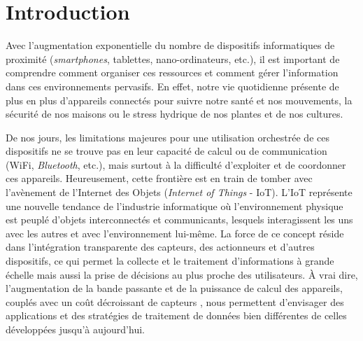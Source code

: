 \begin{resume}
	
	
	
	
\end{resume}

\section{Introduction}

Avec l'augmentation exponentielle du nombre de dispositifs informatiques de proximité (\textit{smartphones}, tablettes, nano-ordinateurs, etc.),  il est important de comprendre comment organiser ces ressources et comment gérer l'information dans ces environnements pervasifs. 
En effet, notre vie quotidienne présente de plus en plus d'appareils connectés pour suivre notre santé et nos mouvements, la sécurité de nos maisons ou le stress hydrique de nos plantes et de nos cultures. 

De nos jours, les limitations majeures pour une utilisation orchestrée de ces dispositifs ne se trouve pas en leur capacité de calcul ou de communication (WiFi, \textit{Bluetooth}, etc.), mais surtout à la difficulté d'exploiter et de coordonner ces appareils. Heureusement, cette frontière est en train de tomber avec l'avènement de l'Internet des Objets (\textit{Internet of Things} - IoT). L'IoT représente une nouvelle tendance de l'industrie informatique où l'environnement physique est peuplé d'objets interconnectés et communicants, lesquels interagissent les uns avec les autres et avec l'environnement lui-même. La force de ce concept réside dans l'intégration transparente des capteurs, des actionneurs et d'autres dispositifs, ce qui permet la collecte et le traitement d'informations à grande échelle mais aussi la prise de décisions au plus proche des utilisateurs. À vrai dire, l'augmentation de la bande passante et de la puissance de calcul des appareils, couplés avec un coût décroissant de capteurs \cite{Jones2014}, nous permettent d'envisager des applications et des stratégies de traitement de données bien différentes de celles développées jusqu'à aujourd'hui.


